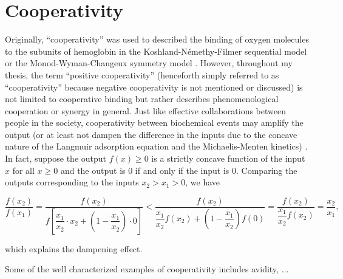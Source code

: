 \section{Cooperativity}

Originally, ``cooperativity'' was used to described the binding of oxygen molecules to the subunits of hemoglobin in the Koshland-N{\'e}methy-Filmer sequential model \cite{KNF} or the Monod-Wyman-Changeux symmetry model \cite{MWC}. However, throughout my thesis, the term ``positive cooperativity'' (henceforth simply referred to as ``cooperativity'' because negative cooperativity is not mentioned or discussed) is not limited to cooperative binding but rather describes phenomenological cooperation or synergy in general. Just like effective collaborations between people in the society, cooperativity between biochemical events may amplify the output (or at least not dampen the difference in the inputs due to the concave nature of the Langmuir adsorption equation and the Michaelis-Menten kinetics) \cite{CooperativityQA}. In fact, suppose the output $f(x) \geq 0$ is a strictly concave function of the input $x$ for all $x \geq 0$ and the output is 0 if and only if the input is 0. Comparing the outputs corresponding to the inputs $x_2 > x_1 > 0$, we have

\begin{equation*}
    \dfrac{f(x_2)}{f(x_1)} = \dfrac{f(x_2)}{f[\dfrac{x_1}{x_2} \cdot x_2 + (1-\dfrac{x_1}{x_2}) \cdot 0]} < \dfrac{f(x_2)}{\dfrac{x_1}{x_2}f(x_2) + (1-\dfrac{x_1}{x_2})f(0)} = \dfrac{f(x_2)}{\dfrac{x_1}{x_2}f(x_2)} = \dfrac{x_2}{x_1},
\end{equation*}

which explains the dampening effect.

Some of the well characterized examples of cooperativity includes avidity, ...
